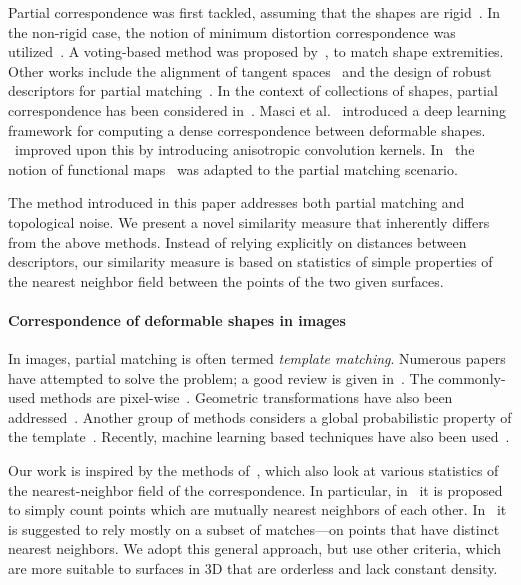 Partial correspondence was first tackled, assuming that the shapes are rigid~\cite{Aiger:2008:CSR:1360612.1360684,albarelli2015fast,itskovich2011surface}.
In the non-rigid case, the notion of  minimum distortion correspondence was utilized~\cite{bronstein2009partial,rodola2013elastic,Torsello:2012:GAD:2354409.2354702}.
A voting-based method was proposed by~\cite{sahilliouglu2014multiple}, to match shape extremities.
Other works include the alignment of tangent spaces~\cite{Brunton:2014:LRR:2592295.2592390} and the design of robust descriptors for partial matching~\cite{vanKaick:2013:BMP:2771539.2771553}.
In the context of collections of shapes, partial correspondence has been considered in~\cite{cosmo2017consistent,huang2014functional}.
Masci et al.~\cite{Masci:2015:GCN:2919341.2920992} introduced a deep learning framework for computing a dense correspondence between deformable shapes.
\cite{boscaini2016learning}~improved upon this by introducing anisotropic convolution kernels.
In~\cite{rodola2017partial,litany2017fully} the notion of functional maps~\cite{Ovsjanikov:2012:FMF:2185520.2185526} was adapted to the partial matching scenario.

The method introduced in this paper addresses both partial matching and topological noise.
We present a novel similarity measure that inherently differs from the above methods.
Instead of relying explicitly on distances between descriptors, our similarity measure is based on statistics of simple properties of the nearest neighbor field between the points of the two given surfaces.

\paragraph{Correspondence of deformable shapes in images}
In images, partial matching is often termed {\em template matching}.
Numerous papers have attempted to solve the problem; a good review is given in~\cite{ouyang2012performance}.
The commonly-used methods are pixel-wise~\cite{chen2003fast,hel2014matching}.
Geometric transformations have also been addressed~\cite{tian2012globally,tsai2002rotation}.
Another group of methods considers a global probabilistic property of the template~\cite{comaniciu2000real,oron2015locally}.
Recently, machine learning based techniques have also been used~\cite{aberman2018neural}.

Our work is inspired by the methods of~\cite{dekel2015best,talmi2017template}, which also look at various statistics of the nearest-neighbor field of the correspondence.
In particular, in~\cite{dekel2015best} it is proposed to simply count points which are mutually nearest neighbors of each other.
In~\cite{talmi2017template} it is suggested to rely mostly on a subset of matches---on points that have distinct nearest neighbors.
We adopt this general approach, but use other criteria, which are more suitable to surfaces in 3D that are orderless and lack constant density.